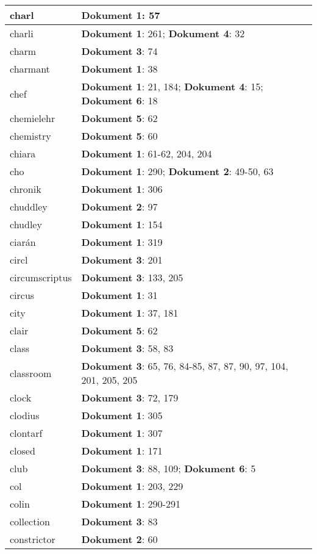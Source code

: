 \documentclass[a5paper]{article}
\begin{document}
\begin{longtable}[l]{|l|p{3in}|}
\hline
charl & \textbf{Dokument 1}: 57 \\
\hline
charli & \textbf{Dokument 1}: 261; \textbf{Dokument 4}: 32 \\
\hline
charm & \textbf{Dokument 3}: 74 \\
\hline
charmant & \textbf{Dokument 1}: 38 \\
\hline
chef & \textbf{Dokument 1}: 21, 184; \textbf{Dokument 4}: 15; \textbf{Dokument 6}: 18 \\
\hline
chemielehr & \textbf{Dokument 5}: 62 \\
\hline
chemistry & \textbf{Dokument 5}: 60 \\
\hline
chiara & \textbf{Dokument 1}: 61-62, 204, 204 \\
\hline
cho & \textbf{Dokument 1}: 290; \textbf{Dokument 2}: 49-50, 63 \\
\hline
chronik & \textbf{Dokument 1}: 306 \\
\hline
chuddley & \textbf{Dokument 2}: 97 \\
\hline
chudley & \textbf{Dokument 1}: 154 \\
\hline
ciarán & \textbf{Dokument 1}: 319 \\
\hline
circl & \textbf{Dokument 3}: 201 \\
\hline
circumscriptus & \textbf{Dokument 3}: 133, 205 \\
\hline
circus & \textbf{Dokument 1}: 31 \\
\hline
city & \textbf{Dokument 1}: 37, 181 \\
\hline
clair & \textbf{Dokument 5}: 62 \\
\hline
class & \textbf{Dokument 3}: 58, 83 \\
\hline
classroom & \textbf{Dokument 3}: 65, 76, 84-85, 87, 87, 90, 97, 104, 201, 205, 205 \\
\hline
clock & \textbf{Dokument 3}: 72, 179 \\
\hline
clodius & \textbf{Dokument 1}: 305 \\
\hline
clontarf & \textbf{Dokument 1}: 307 \\
\hline
closed & \textbf{Dokument 1}: 171 \\
\hline
club & \textbf{Dokument 3}: 88, 109; \textbf{Dokument 6}: 5 \\
\hline
col & \textbf{Dokument 1}: 203, 229 \\
\hline
colin & \textbf{Dokument 1}: 290-291 \\
\hline
collection & \textbf{Dokument 3}: 83 \\
\hline
constrictor & \textbf{Dokument 2}: 60 \\

\end{longtable}
\end{document}

